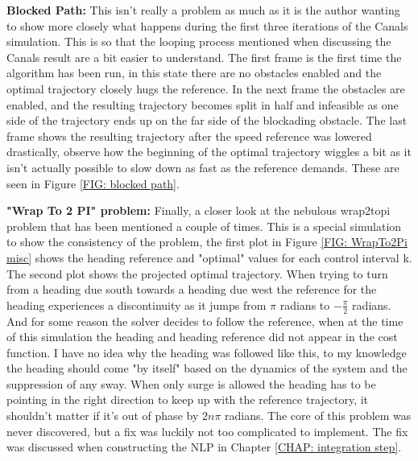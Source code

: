 \textbf{Blocked Path:}\newline
This isn't really a problem as much as it is the author wanting to show more closely what happens during the first three iterations
of the Canals simulation. This is so that the looping process mentioned when discussing the Canals result are a bit easier to understand.
The first frame is the first time the algorithm has been run, in this state there are no obstacles enabled and the optimal trajectory
closely hugs the reference. In the next frame the obstacles are enabled, and the resulting trajectory becomes split in half and infeasible
as one side of the trajectory ends up on the far side of the blockading obstacle. The last frame shows the resulting trajectory
after the speed reference was lowered drastically, observe how the beginning of the optimal trajectory wiggles a bit as it isn't 
actually possible to slow down as fast as the reference demands. These are seen in Figure \ref{FIG: blocked path}.

\textbf{"Wrap To 2 PI" problem:}\newline
Finally, a closer look at the nebulous wrap2topi problem that has been mentioned a couple of times. This is a special simulation
to show the consistency of the problem, the first plot in Figure \ref{FIG: WrapTo2Pi misc} shows the heading reference and
"optimal" values for each control interval k. The second plot shows the projected optimal trajectory.
When trying to turn from a heading due south towards a heading due west the reference for the heading experiences a 
discontinuity as it jumps from $\pi$ radians to $-\frac{\pi}{2}$ radians. And for some reason the solver decides to follow the reference, when 
at the time of this simulation the heading and heading reference did not appear in the cost function. I have no idea why
the heading was followed like this, to my knowledge the heading should come "by itself" based on the dynamics of the system and the
suppression of any sway. When only surge is allowed the heading has to be pointing in the right direction to keep up with
the reference trajectory, it shouldn't matter if it's out of phase by $2n\pi$ radians. The core of this problem was never discovered, but
a fix was luckily not too complicated to implement. The fix was discussed when constructing the \gls{NLP} in Chapter \ref{CHAP: integration step}.

